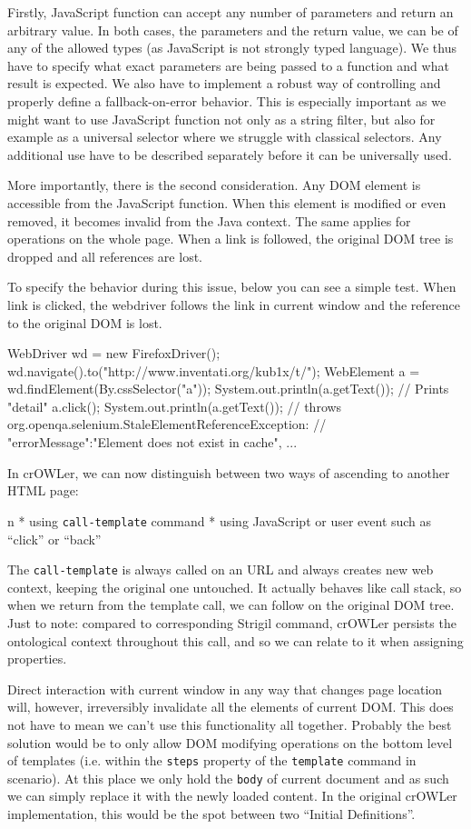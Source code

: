 Firstly, JavaScript function can accept any number of parameters and return an
arbitrary value. In both cases, the parameters and the return value, we can be
of any of the allowed types (as JavaScript is not strongly typed language). We
thus have to specify what exact parameters are being passed to a function and
what result is expected. We also have to implement a robust way of controlling
and properly define a fallback-on-error behavior. This is especially important
as we might want to use JavaScript function not only as a string filter, but also
for example as a universal selector where we struggle with classical selectors. 
Any additional use have to be described separately before it can be universally
used. 

More importantly, there is the second consideration. Any DOM element is
accessible from the JavaScript function. When this element is modified or even
removed, it becomes invalid from the Java context. The same applies for
operations on the whole page. When a link is followed, the original DOM tree 
is dropped and all references are lost. 

To specify the behavior during this issue, below you can see a simple test.
When link is clicked, the webdriver follows the link in current window and the
reference to the original DOM is lost. 

\begtt
WebDriver wd = new FirefoxDriver();
wd.navigate().to("http://www.inventati.org/kub1x/t/");
WebElement a = wd.findElement(By.cssSelector("a"));
System.out.println(a.getText()); // Prints "detail"
a.click();
System.out.println(a.getText());
// throws org.openqa.selenium.StaleElementReferenceException:
// { "errorMessage":"Element does not exist in cache", ... }
\endtt

In crOWLer, we can now distinguish between two ways of ascending to another HTML page: 

\begitems \style n
  * using {\tt call-template} command
  * using JavaScript or user event such as ``click'' or ``back''
\enditems

The {\tt call-template} is always called on an URL and always creates new web
context, keeping the original one untouched. It actually behaves like call
stack, so when we return from the template call, we can follow on the original
DOM tree. Just to note: compared to corresponding Strigil command, crOWLer
persists the ontological context throughout this call, and so we can relate to it
when assigning properties. 

Direct interaction with current window in any way that changes page location
will, however, irreversibly invalidate all the elements of current DOM. This
does not have to mean we can't use this functionality all together. Probably the
best solution would be to only allow DOM modifying operations on the bottom
level of templates (i.e. within the {\tt steps} property of the {\tt template}
command in scenario). At this place we only hold the {\tt body} of current
document and as such we can simply replace it with the newly loaded content. 
In the original crOWLer implementation, this would be the spot between two
``Initial Definitions''. 

